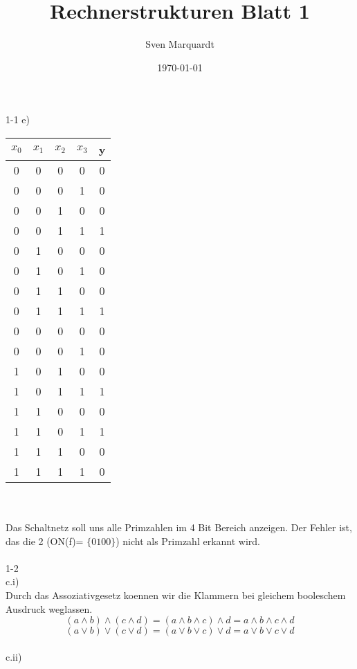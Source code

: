 \documentclass[11pt,a4paper]{article}
\title{Rechnerstrukturen Blatt 1}
\author{Sven Marquardt}
\date{\today}
\begin{document}
1-1 e)
\\
\begin{tabular}{c | c | c | c | c}
$x_0$ & $x_1$ & $x_2$& $x_3$ & y \\ \hline
0&0&0&0&0\\
0&0&0&1&0\\ \hline
0&0&1&0&0\\ \hline
0&0&1&1&1\\ \hline
0&1&0&0&0\\
0&1&0&1&0\\
0&1&1&0&0\\
0&1&1&1&1\\ \hline
0&0&0&0&0\\
0&0&0&1&0\\
1&0&1&0&0\\
1&0&1&1&1\\ \hline
1&1&0&0&0\\
1&1&0&1&1\\
1&1&1&0&0\\
1&1&1&1&0\\
\end{tabular}
\\
\\
Das Schaltnetz soll uns alle Primzahlen im 4 Bit Bereich anzeigen. Der Fehler ist, das die 2 (ON(f)=
$\lbrace 0100 \rbrace$)
nicht als Primzahl erkannt wird. \\ \\
1-2\\
c.i)\\
Durch das Assoziativgesetz  koennen wir die Klammern bei gleichem booleschem Ausdruck weglassen.
\begin{equation}
\label{Assoziativ1}
( a \wedge b) \wedge (c \wedge d) = (a \wedge b \wedge c) \wedge d=a \wedge b \wedge c \wedge d 
\end{equation}
\begin{equation}
( a \vee b)\vee (c \vee d)= (a \vee b \vee c) \vee d= a \vee b \vee c \vee d
\end{equation}
\\
c.ii)\\
\end{document}
